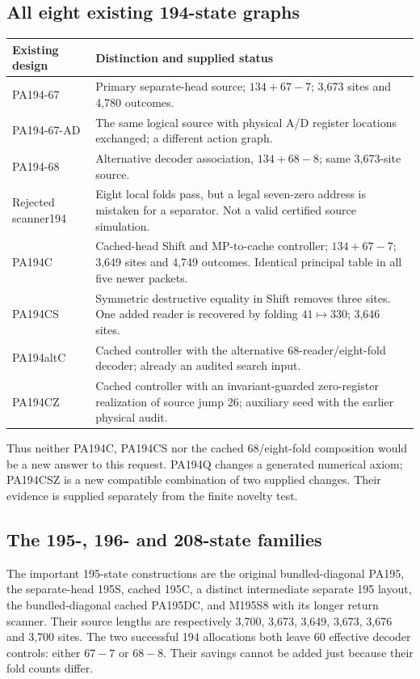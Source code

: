 \documentclass[11pt,letterpaper]{article}
\begin{document}
\subsection{All eight existing 194-state graphs}

\begin{center}\small
\begin{tabularx}{\linewidth}{@{}lX@{}}
\toprule
Existing design & Distinction and supplied status\\\midrule
PA194-67 & Primary separate-head source; $134+67-7$; 3,673 sites and 4,780 outcomes.\\
PA194-67-AD & The same logical source with physical A/D register locations exchanged; a different action graph.\\
PA194-68 & Alternative decoder association, $134+68-8$; same 3,673-site source.\\
Rejected scanner194 & Eight local folds pass, but a legal seven-zero address is mistaken for a separator. Not a valid certified source simulation.\\
PA194C & Cached-head Shift and MP-to-cache controller; $134+67-7$; 3,649 sites and 4,749 outcomes. Identical principal table in all five newer packets.\\
PA194CS & Symmetric destructive equality in Shift removes three sites. One added reader is recovered by folding $41\mapsto330$; 3,646 sites.\\
PA194altC & Cached controller with the alternative 68-reader/eight-fold decoder; already an audited search input.\\
PA194CZ & Cached controller with an invariant-guarded zero-register realization of source jump 26; auxiliary seed with the earlier physical audit.\\
\bottomrule
\end{tabularx}
\end{center}
Thus neither PA194C, PA194CS nor the cached 68/eight-fold composition
would be a new answer to this request. PA194Q changes a generated numerical
axiom; PA194CSZ is a new compatible combination of two supplied changes.
Their evidence is supplied separately from the finite novelty test.

\subsection{The 195-, 196- and 208-state families}

The important 195-state constructions are the original bundled-diagonal
PA195, the separate-head 195S, cached 195C, a distinct intermediate separate
195 layout, the bundled-diagonal cached PA195DC, and M195S8 with its longer
return scanner. Their source lengths are respectively 3,700, 3,673, 3,649,
3,673, 3,676 and 3,700 sites. The two successful 194 allocations both leave
60 effective decoder controls: either $67-7$ or $68-8$. Their savings
cannot be added just because their fold counts differ.
\end{document}
